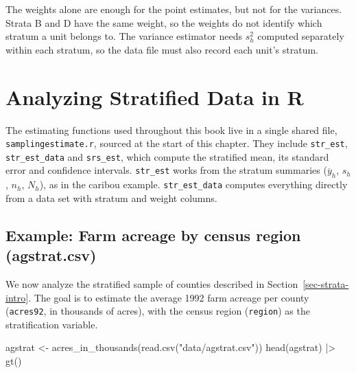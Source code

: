 \documentclass[
  letterpaper,
  DIV=11,
  numbers=noendperiod]{scrreprt}
\newenvironment{Shaded}{\begin{snugshade}}{\end{snugshade}}
\newcommand{\FunctionTok}[1]{\textcolor[rgb]{0.28,0.35,0.67}{#1}}
\newcommand{\NormalTok}[1]{\textcolor[rgb]{0.00,0.23,0.31}{#1}}
\newcommand{\OtherTok}[1]{\textcolor[rgb]{0.00,0.23,0.31}{#1}}
\newcommand{\SpecialCharTok}[1]{\textcolor[rgb]{0.37,0.37,0.37}{#1}}
\newcommand{\StringTok}[1]{\textcolor[rgb]{0.13,0.47,0.30}{#1}}
\renewcommand{\[}{\begin{equation}}
\renewcommand{\]}{\end{equation}}
\begin{document}
The weights alone are enough for the point estimates, but not for the
variances. Strata B and D have the same weight, so the weights do not
identify which stratum a unit belongs to. The variance estimator needs
\(s_h^2\) computed separately within each stratum, so the data file must
also record each unit's stratum.

\section{Analyzing Stratified Data in R}\label{sec-strata-functions}

The estimating functions used throughout this book live in a single
shared file, \texttt{samplingestimate.r}, sourced at the start of this
chapter. They include \texttt{str\_est}, \texttt{str\_est\_data} and
\texttt{srs\_est}, which compute the stratified mean, its standard error
and confidence intervals. \texttt{str\_est} works from the stratum
summaries (\(\overline y_h\), \(s_h\), \(n_h\), \(N_h\)), as in the
caribou example. \texttt{str\_est\_data} computes everything directly
from a data set with stratum and weight columns.

\subsection{Example: Farm acreage by census region
(agstrat.csv)}\label{sec-strata-agstrat}

We now analyze the stratified sample of counties described in
Section~\ref{sec-strata-intro}. The goal is to estimate the average 1992
farm acreage per county (\texttt{acres92}, in thousands of acres), with
the census region (\texttt{region}) as the stratification variable.

\begin{Shaded}
\begin{Highlighting}[]
\NormalTok{agstrat }\OtherTok{\textless{}{-}} \FunctionTok{acres\_in\_thousands}\NormalTok{(}\FunctionTok{read.csv}\NormalTok{(}\StringTok{"data/agstrat.csv"}\NormalTok{))}
\FunctionTok{head}\NormalTok{(agstrat) }\SpecialCharTok{|\textgreater{}} \FunctionTok{gt}\NormalTok{()}
\end{Highlighting}
\end{Shaded}
\end{document}
